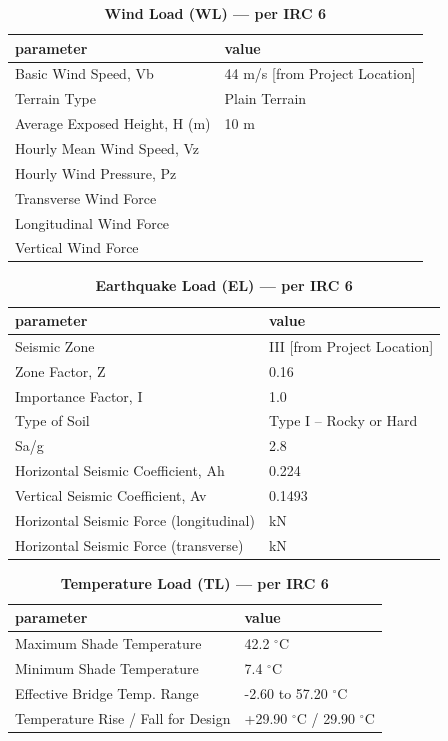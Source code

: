 \documentclass[12pt,a4paper]{report}
\numberwithin{table}{chapter}
\numberwithin{figure}{chapter}
\begin{document}
\vspace{1em}
\begin{longtable}{|L{5.5cm}|p{10.0cm}|}
\caption{\textbf{Wind Load (WL) --- per IRC 6}}
\hline
\textbf{parameter} & \textbf{value} \\
\hline
\textnormal{Basic Wind Speed, Vb} & 44 m/s [from Project Location] \\[6pt]
\hline
\textnormal{Terrain Type} & Plain Terrain \\[6pt]
\hline
\textnormal{Average Exposed Height, H (m)} & 10 m \\[6pt]
\hline
\textnormal{Hourly Mean Wind Speed, Vz} &  \\[6pt]
\hline
\textnormal{Hourly Wind Pressure, Pz} &  \\[6pt]
\hline
\textnormal{Transverse Wind Force} &  \\[6pt]
\hline
\textnormal{Longitudinal Wind Force} &  \\[6pt]
\hline
\textnormal{Vertical Wind Force} &  \\[6pt]
\hline
\end{longtable}

\vspace{1em}
\begin{longtable}{|L{5.5cm}|p{10.0cm}|}
\caption{\textbf{Earthquake Load (EL) --- per IRC 6}}
\hline
\textbf{parameter} & \textbf{value} \\
\hline
\textnormal{Seismic Zone} & III [from Project Location] \\[6pt]
\hline
\textnormal{Zone Factor, Z} & 0.16 \\[6pt]
\hline
\textnormal{Importance Factor, I} & 1.0 \\[6pt]
\hline
\textnormal{Type of Soil} & Type I – Rocky or Hard \\[6pt]
\hline
\textnormal{Sa/g} & 2.8 \\[6pt]
\hline
\textnormal{Horizontal Seismic Coefficient, Ah} & 0.224 \\[6pt]
\hline
\textnormal{Vertical Seismic Coefficient, Av} & 0.1493 \\[6pt]
\hline
\textnormal{Horizontal Seismic Force (longitudinal)} &  kN \\[6pt]
\hline
\textnormal{Horizontal Seismic Force (transverse)} &  kN \\[6pt]
\hline
\end{longtable}

\vspace{1em}
\begin{longtable}{|L{5.5cm}|p{10.0cm}|}
\caption{\textbf{Temperature Load (TL) --- per IRC 6}}
\hline
\textbf{parameter} & \textbf{value} \\
\hline
\textnormal{Maximum Shade Temperature} & 42.2 $^\circ$C \\[6pt]
\hline
\textnormal{Minimum Shade Temperature} & 7.4 $^\circ$C \\[6pt]
\hline
\textnormal{Effective Bridge Temp. Range} & -2.60 to 57.20 $^\circ$C \\[6pt]
\hline
\textnormal{Temperature Rise / Fall for Design} & +29.90 $^\circ$C / \textminus{}29.90 $^\circ$C \\[6pt]
\hline
\end{longtable}
\end{document}
